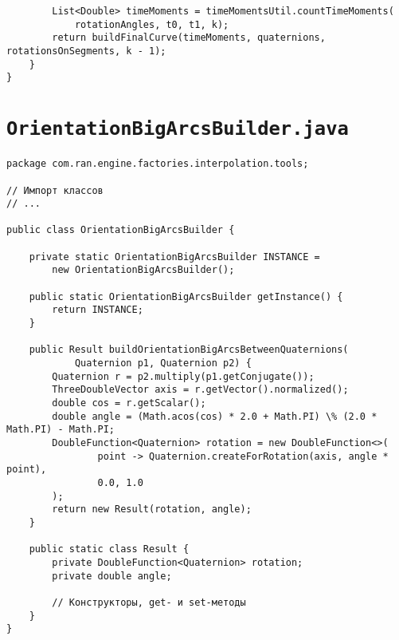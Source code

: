 \begin{verbatim}
        List<Double> timeMoments = timeMomentsUtil.countTimeMoments(
            rotationAngles, t0, t1, k);
        return buildFinalCurve(timeMoments, quaternions, rotationsOnSegments, k - 1);
    }
}
\end{verbatim}

\section*{\texttt{OrientationBigArcsBuilder.java}}
\begin{verbatim}
package com.ran.engine.factories.interpolation.tools;

// Импорт классов
// ...

public class OrientationBigArcsBuilder {

    private static OrientationBigArcsBuilder INSTANCE =
        new OrientationBigArcsBuilder();

    public static OrientationBigArcsBuilder getInstance() {
        return INSTANCE;
    }

    public Result buildOrientationBigArcsBetweenQuaternions(
            Quaternion p1, Quaternion p2) {
        Quaternion r = p2.multiply(p1.getConjugate());
        ThreeDoubleVector axis = r.getVector().normalized();
        double cos = r.getScalar();
        double angle = (Math.acos(cos) * 2.0 + Math.PI) \% (2.0 * Math.PI) - Math.PI;
        DoubleFunction<Quaternion> rotation = new DoubleFunction<>(
                point -> Quaternion.createForRotation(axis, angle * point),
                0.0, 1.0
        );
        return new Result(rotation, angle);
    }

    public static class Result {
        private DoubleFunction<Quaternion> rotation;
        private double angle;

        // Конструкторы, get- и set-методы
    }
}
\end{verbatim}

